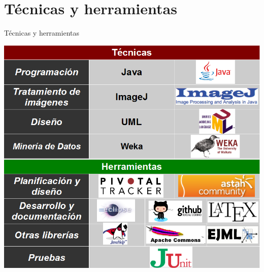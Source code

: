 \documentclass[10pt]{beamer}
\begin{document}
\section{Técnicas y herramientas}
\begin{frame}{Técnicas y herramientas}

{\centering \includegraphics[scale=0.4]{AAUgraphics/tecnicas.png}\par}


\end{frame}
\end{document}
